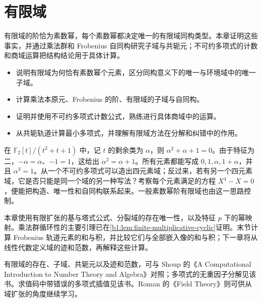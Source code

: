
\chapter{有限域}
\label{b1:ch:17}

\begin{chapterabstract}
	有限域的阶恰为素数幂，每个素数幂都决定唯一的有限域同构类型。本章证明这些事实，并通过乘法群和 Frobenius 自同构研究子域与共轭元；不可约多项式的计数和商域运算把结构结论用于具体计算。
\end{chapterabstract}

\begin{learninggoals}
	\begin{itemize}
		\item 说明有限域为何恰有素数幂个元素，区分同构意义下的唯一与环境域中的唯一子域。
		\item 计算乘法本原元、Frobenius 的阶、有限域的子域与自同构。
		\item 证明并使用不可约多项式计数公式，熟练进行具体商域中的运算。
		\item 从共轭轨道计算最小多项式，并理解有限域方法在分解和纠错中的作用。
	\end{itemize}
\end{learninggoals}

在 \(\mathbb F_2[t]/(t^2+t+1)\) 中，记 \(t\) 的剩余类为 \(\alpha\)，则 \(\alpha^2+\alpha+1=0\)。由于特征为二，\(-\alpha=\alpha\)、\(-1=1\)，这给出 \(\alpha^2=\alpha+1\)。所有元素都能写成 \(0,1,\alpha,1+\alpha\)，并且 \(\alpha^3=1\)。从一个不可约多项式可以造出四元素域；反过来，若有另一个四元素域，它是否只能是同一个域的另一种写法？考察每个元素满足的方程 \(X^4-X=0\)，便能把构造、唯一性和自同构联系起来。一般素数幂阶有限域也由这一思路控制。

\ProseParagraphBreak

本章使用有限扩张的基与塔式公式、分裂域的存在唯一性，以及特征 \(p\) 下的幂映射。乘法群循环性的主要引理已在\cref{b1:lem:finite-multiplicative-cyclic}证明。末节计算 Frobenius 轨道元素的和与积，并比较它们与全部嵌入像的和与积；下一章将从线性代数定义域的迹和范数，再解释这些计算。

\ProseParagraphBreak
有限域的存在、子域、共轭元以及迹和范数，可与 Shoup 的《A Computational Introduction to Number Theory and Algebra》\cite[Chapter 19]{Shoup2008NumberTheoryAlgebra}对照；多项式的无重因子分解见该书\cite[Section 20.3]{Shoup2008NumberTheoryAlgebra}。求值码中带错误的多项式插值见该书\cite[Section 17.5.2]{Shoup2008NumberTheoryAlgebra}。Roman 的《Field Theory》\cite[Chapter 9; Section 10.1]{Roman2006FieldTheory}则可供从域扩张的角度继续学习。

